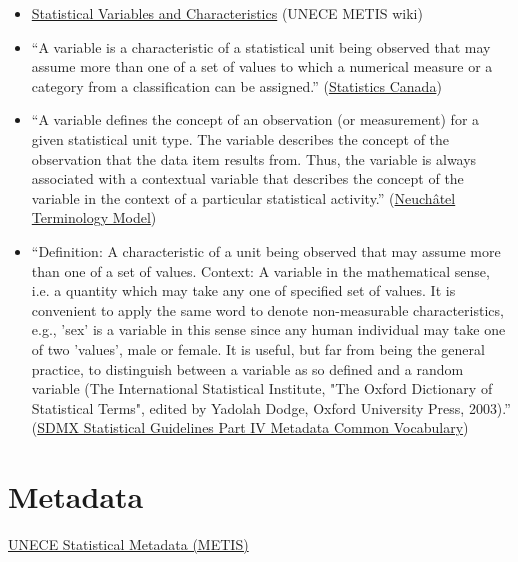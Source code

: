 \begin{itemize}

\item \href{http://www1.unece.org/stat/platform/display/metis/Statistical+Variables+and+Characteristics}{Statistical
  Variables and Characteristics} (UNECE METIS wiki)

\item ``A variable is a characteristic of a statistical unit being observed that may assume more than one of a set of values to which a numerical measure or a category from a classification can be assigned.'' (\href{http://www.statcan.gc.ca/concepts/variable-eng.htm}{Statistics Canada})

\item ``A variable defines the concept of an observation (or measurement) for a given statistical unit type. The variable describes the concept of the observation that the data item results from. Thus, the variable is always associated with a contextual variable that describes the concept of the variable in the context of a particular statistical activity.'' (\href{http://www1.unece.org/stat/platform/download/attachments/14319930/Neuchatel+Model+V1.pdf?version=1}{Neuchâtel Terminology Model})

\item ``Definition: A characteristic of a unit being observed that may assume more than one of
a set of values.  Context: A variable in the mathematical sense, i.e. a quantity which may take any
one of specified set of values. It is convenient to apply the same word to
denote non-measurable characteristics, e.g., 'sex' is a variable in this sense
since any human individual may take one of two 'values', male or female. It
is useful, but far from being the general practice, to distinguish between a
variable as so defined and a random variable (The International Statistical
Institute, "The Oxford Dictionary of Statistical Terms", edited by Yadolah
Dodge, Oxford University Press, 2003).'' (\href{http://sdmx.org/wp-content/uploads/2009/01/04\_sdmx\_cog\_annex\_4\_mcv\_2009.pdf}{SDMX Statistical Guidelines Part IV Metadata Common Vocabulary})
\end{itemize}


\chapter{Metadata}

\href{http://www.unece.org/stats/metis.html}{UNECE Statistical Metadata (METIS)}

